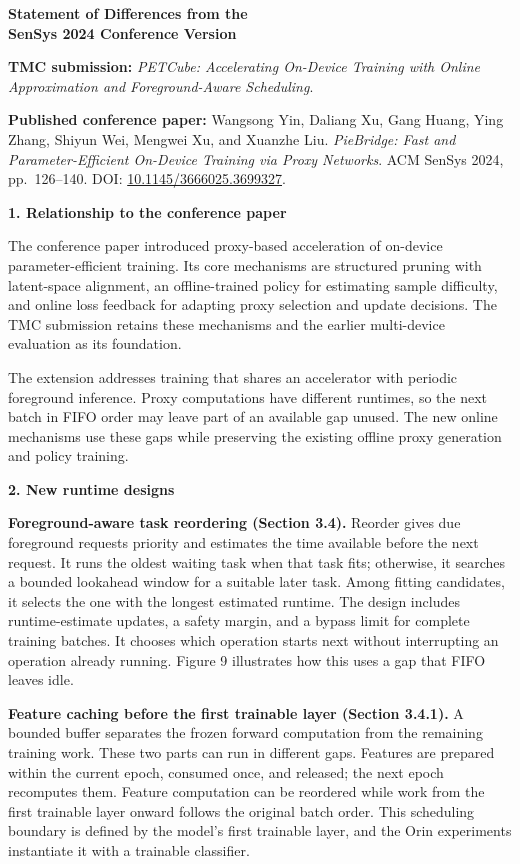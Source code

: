 \documentclass[11pt,letterpaper]{article}
\begin{document}
\begin{center}
{\Large\bfseries Statement of Differences from the\\[3pt] SenSys 2024 Conference Version}
\end{center}

\textbf{TMC submission:} \textit{PETCube: Accelerating On-Device Training with Online Approximation and Foreground-Aware Scheduling}.

\textbf{Published conference paper:} Wangsong Yin, Daliang Xu, Gang Huang, Ying Zhang, Shiyun Wei, Mengwei Xu, and Xuanzhe Liu.
\textit{PieBridge: Fast and Parameter-Efficient On-Device Training via Proxy Networks}.
ACM SenSys 2024, pp.\ 126--140.
DOI: \href{https://doi.org/10.1145/3666025.3699327}{10.1145/3666025.3699327}.

\textbf{1. Relationship to the conference paper}

The conference paper introduced proxy-based acceleration of on-device parameter-efficient training. Its core mechanisms are structured pruning with latent-space alignment, an offline-trained policy for estimating sample difficulty, and online loss feedback for adapting proxy selection and update decisions. The TMC submission retains these mechanisms and the earlier multi-device evaluation as its foundation.

The extension addresses training that shares an accelerator with periodic foreground inference. Proxy computations have different runtimes, so the next batch in FIFO order may leave part of an available gap unused. The new online mechanisms use these gaps while preserving the existing offline proxy generation and policy training.

\textbf{2. New runtime designs}

\textbf{Foreground-aware task reordering (Section 3.4).}
Reorder gives due foreground requests priority and estimates the time available before the next request. It runs the oldest waiting task when that task fits; otherwise, it searches a bounded lookahead window for a suitable later task. Among fitting candidates, it selects the one with the longest estimated runtime. The design includes runtime-estimate updates, a safety margin, and a bypass limit for complete training batches. It chooses which operation starts next without interrupting an operation already running. Figure 9 illustrates how this uses a gap that FIFO leaves idle.

\textbf{Feature caching before the first trainable layer (Section 3.4.1).}
A bounded buffer separates the frozen forward computation from the remaining training work. These two parts can run in different gaps. Features are prepared within the current epoch, consumed once, and released; the next epoch recomputes them. Feature computation can be reordered while work from the first trainable layer onward follows the original batch order. This scheduling boundary is defined by the model's first trainable layer, and the Orin experiments instantiate it with a trainable classifier.
\end{document}

